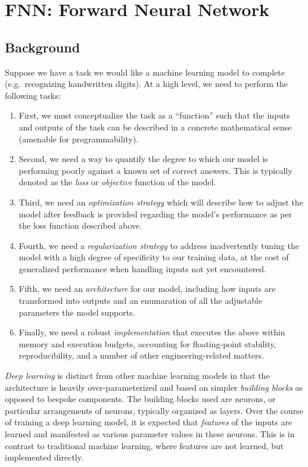 \section{FNN: Forward Neural Network}

\subsection{Background}\label{background}

Suppose we have a task we would like a machine learning model to
complete (e.g.~recognizing handwritten digits). At a high level, we need
to perform the following tasks:

\begin{enumerate}
	\item
	First, we must conceptualize the task as a ``function'' such that the
	inputs and outputs of the task can be described in a concrete
	mathematical sense (amenable for programmability).
	\item
	Second, we need a way to quantify the degree to which our model is
	performing poorly against a known set of correct answers. This is
	typically denoted as the \emph{loss} or \emph{objective} function of
	the model.
	\item
	Third, we need an \emph{optimization strategy} which will describe how
	to adjust the model after feedback is provided regarding the model's
	performance as per the loss function described above.
	\item
	Fourth, we need a \emph{regularization strategy} to address
	inadvertently tuning the model with a high degree of specificity to
	our training data, at the cost of generalized performance when
	handling inputs not yet encountered.
	\item
	Fifth, we need an \emph{architecture} for our model, including how
	inputs are transformed into outputs and an enumaration of all the
	adjustable parameters the model supports.
	\item
	Finally, we need a robust \emph{implementation} that executes the
	above within memory and execution budgets, accounting for
	floating-point stability, reproducibility, and a number of other
	engineering-related matters.
\end{enumerate}

\emph{Deep learning} is distinct from other machine learning models in
that the architecture is heavily over-parameterized and based on simpler
\emph{building blocks} as opposed to bespoke components. The building
blocks used are neurons, or particular arrangements of neurons,
typically organized as layers. Over the course of training a deep
learning model, it is expected that \emph{features} of the inputs are
learned and manifested as various parameter values in these neurons.
This is in contrast to traditional machine learning, where features are
not learned, but implemented directly.

